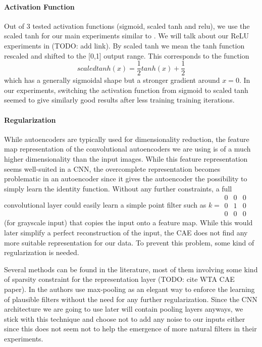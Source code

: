 \documentclass{article}
\begin{document}
    \paragraph{Activation Function}
    \label{par:activation_function}
    Out of 3 tested activation functions (sigmoid, scaled tanh and relu), we use the scaled tanh for our main experiments similar to \citep{masci2011stacked}. We will talk about our ReLU experiments in (TODO: add link). By scaled tanh we mean the tanh function rescaled and shifted to the [0,1] output range. This corresponds to the function $$scaledtanh(x) = \frac{1}{2}tanh(x) + \frac{1}{2}$$ which has a generally sigmoidal shape but a stronger gradient around $x = 0$. In our experiments, switching the activation function from sigmoid to scaled tanh seemed to give similarly good results after less training training iterations. 

    \paragraph{Regularization} 
    While autoencoders are typically used for dimensionality reduction, the feature map representation of the convolutional autoencoders we are using is of a much higher dimensionality than the input images. While this feature representation seems well-suited in a CNN, the overcomplete representation becomes problematic in an autoencoder since it gives the autoencoder the possibility to simply learn the identity function. 
    Without any further constraints, a full convolutional layer could easily learn a simple point filter such as $k = \begin{smallmatrix} 0&0&0\\ 0&1&0 \\ 0&0&0 \end{smallmatrix}$ (for grayscale input) that copies the input onto a feature map. While this would later simplify a perfect reconstruction of the input, the CAE does not find any more suitable representation for our data. 
    To prevent this problem, some kind of regularization is needed. 

    Several methods can be found in the literature, most of them involving some kind of sparsity constraint for the representation layer (TODO: cite WTA CAE paper). In \citep{masci2011stacked} the authors use max-pooling as an elegant way to enforce the learning of plausible filters without the need for any further regularization. Since the CNN architecture we are going to use later will contain pooling layers anyways, we stick with this technique and choose not to add any noise to our inputs either since this does not seem not to help the emergence of more natural filters in their experiments. 
\end{document}
